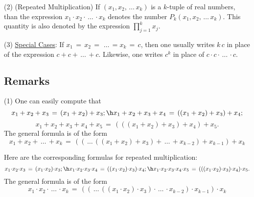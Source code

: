 {\V

        (2) (Repeated Multiplication) If $(x_{1},x_{2},\,{\ldots}\,x_{k})$ is a $k$-tuple of real numbers,
    than the expression $x_{1}{\cdot}x_{2}{\cdot}\,{\ldots}\,{\cdot}x_{k}$ denotes the number $P_{k}(x_{1},x_{2},\,{\ldots}\,x_{k})$.
    This quantity is also denoted by the expression $\prod_{j=1}^{k} x_{j}$.

\V

        (3) \underline{Special Cases}: If $x_{1} \,=\, x_{2} \,=\, \,{\ldots}\, = x_{k} \,=\, c$, then one usually writes $k\,c$ in place of the expression $c+c+\,{\ldots}\,+c$.
    Likewise, one writes $c^{k}$ in place of $c{\cdot}c{\cdot}\,{\ldots}\,{\cdot}c$.

\VV

            \subsection{\small{\bf Remarks}}
            \label{RemrkB10.31}

\V

\hspace*{\parindent}(1) One can easily compute that
        \begin{displaymath}
        x_{1}+x_{2}+x_{3} \,=\, (x_{1}+x_{2})+x_{3}; \h x_{1}+x_{2}+x_{3}+x_{4} \,=\, ((x_{1}+x_{2})+x_{3})+x_{4};
        \end{displaymath}
        \begin{displaymath}
        x_{1}+x_{2}+x_{3}+x_{4}+x_{5} \,=\, (((x_{1}+x_{2})+x_{3})+x_{4})+x_{5}.
        \end{displaymath}
    The general formula is of the form
        \begin{equation}
        \label{EqnB.05A}
        x_{1} + x_{2} + \,{\ldots}\,+ x_{k} \,=\, 
        ((  \,{\ldots}\, ((x_{1} + x_{2}) + x_{3}) + \,{\ldots}\, + x_{k-2}) + x_{k-1}) + x_{k}
        \end{equation}

        Here are the corresponding formulas for repeated multiplication:
        \begin{displaymath}
        x_{1}{\cdot}x_{2}{\cdot}x_{3} \,=\, (x_{1}{\cdot}x_{2}){\cdot}x_{3}; \h x_{1}{\cdot}x_{2}{\cdot}x_{3}{\cdot}x_{4} \,=\, ((x_{1}{\cdot}x_{2}){\cdot}x_{3}){\cdot}x_{4}; \h x_{1}{\cdot}x_{2}{\cdot}x_{3}{\cdot}x_{4}{\cdot}x_{5} \,=\, (((x_{1}{\cdot}x_{2}){\cdot}x_{3}){\cdot}x_{4}){\cdot}x_{5}.
        \end{displaymath}
    The general formula is of the form
        \begin{equation}
        \label{EqnB.05B}
        x_{1} {\cdot} x_{2} {\cdot} \,{\ldots}\,{\cdot} x_{k} \,=\, 
        ((  \,{\ldots}\, ((x_{1} {\cdot} x_{2}) {\cdot} x_{3}) {\cdot} \,{\ldots}\, {\cdot} x_{k-2}) {\cdot} x_{k-1}) {\cdot} x_{k}
        \end{equation}

}
